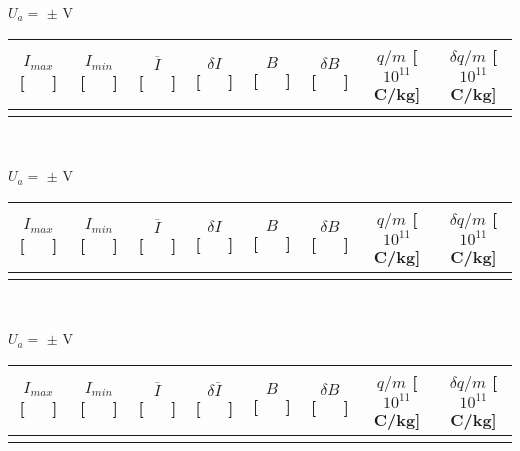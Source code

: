 \documentclass[a4paper,12pt]{article}  %
\begin{document}
\begin{table}[!hbp]
\begin{small}
	\centering

	\noindent	$U_a =$ \underline{\makebox[1.5cm][r]{~}} $\pm$ \underline{\makebox[1cm][r]{~}} V \\
	\begin{tabular}{|c|c|c|c|c|c|c|c|}
	\hline
	 $I_{max}$ [~~~] & $I_{min}$ [~~~] & $\overline{I}$ [~~~]	& $\delta I $ [~~~] & $B$ [~~~] & $\delta B$ [~~~] & $q/m$ [$10^{11}$C/kg] & $\delta q/m$ [$10^{11}$C/kg] \\
	\hline
	 &  &  & &  &  & & \\
	 \hline
 	\end{tabular}\\[10pt]
	\bigskip
	
	\noindent	$U_a =$ \underline{\makebox[1.5cm][r]{~}} $\pm$ \underline{\makebox[1cm][r]{~}} V \\
	\begin{tabular}{|c|c|c|c|c|c|c|c|}
	\hline
	 $I_{max}$ [~~~] & $I_{min}$ [~~~] & $\overline{I}$ [~~~]	& $\delta I $ [~~~] & $B$ [~~~] & $\delta B$ [~~~] & $q/m$ [$10^{11}$C/kg] & $\delta q/m$ [$10^{11}$C/kg] \\
	\hline
	 &  &  & &  &  & & \\
	 \hline
 	\end{tabular}\\[10pt]

	\bigskip
	
	\noindent	$U_a =$ \underline{\makebox[1.5cm][r]{~}} $\pm$ \underline{\makebox[1cm][r]{~}} V \\
	\begin{tabular}{|c|c|c|c|c|c|c|c|}
	\hline
	 $I_{max}$ [~~~] & $I_{min}$ [~~~] & $\overline{I}$ [~~~]	& $\delta \overline{I} $ [~~~] & $B$ [~~~] & $\delta B$ [~~~] & $q/m$ [$10^{11}$C/kg] & $\delta q/m$ [$10^{11}$C/kg] \\
	\hline
	 &  &  & &  &  & & \\
	 \hline
 	\end{tabular}
	
	\label{tab:Dados2}
\end{small}
\end{table}
\end{document}
